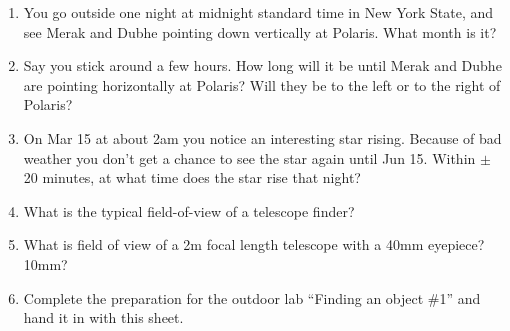 
\begin{enumerate}
\item You go outside one night at midnight standard time in New York
  State, and see Merak and Dubhe pointing down vertically at
  Polaris. What month is it? 
\vspace{80pt}
\item Say you stick around a few hours.  How long will it be until
  Merak and Dubhe are pointing horizontally at Polaris?  Will they be
  to the left or to the right of Polaris?
\vspace{80pt}
\item On Mar 15 at about 2am you notice an interesting star rising.
  Because of bad weather you don’t get a chance to see the star again
  until Jun 15.  Within $\pm$ 20 minutes, at what time does the star
  rise that night?
\vspace{80pt}
\item What is the typical field-of-view of a telescope finder?
\vspace{80pt}
\item What is field of view of a 2m focal length telescope with a 40mm
  eyepiece? 10mm?
\vspace{80pt}
\item Complete the preparation for the outdoor lab ``Finding an object
  \#1'' and hand it in with this sheet.
\end{enumerate}
